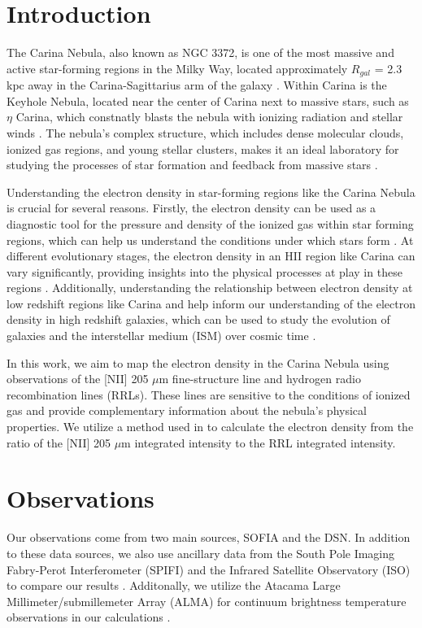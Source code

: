 \section{Introduction}
The Carina Nebula, also known as NGC 3372, is one of the most massive and active star-forming regions in the Milky Way, located approximately $R_{gal}$ = 2.3 kpc away in the Carina-Sagittarius arm of the galaxy \parencite{smith2006census}.
Within Carina is the Keyhole Nebula, located near the center of Carina next to massive stars, such as $\eta$ Carina, which constnatly blasts the nebula with ionizing radiation and stellar winds \parencite{brooks2005simba}.
The nebula's complex structure, which includes dense molecular clouds, ionized gas regions, and young stellar clusters, makes it an ideal laboratory for studying the processes of star formation and feedback from massive stars \parencite{smith2007census}.

Understanding the electron density in star-forming regions like the Carina Nebula is crucial for several reasons. 
Firstly, the electron density can be used as a diagnostic tool for the pressure and density of the ionized gas within star forming regions, which can help us understand the conditions under which stars form \parencite{kaasinen2016cosmos}.
At different evolutionary stages, the electron density in an HII region like Carina can vary significantly, providing insights into the physical processes at play in these regions \parencite{goldsmith2024electron}.
Additionally, understanding the relationship between electron density at low redshift regions like Carina and help inform our understanding of the electron density in high redshift galaxies, which can be used to study the evolution of galaxies and the interstellar medium (ISM) over cosmic time \parencite{shirazi2014stars}.

In this work, we aim to map the electron density in the Carina Nebula using observations of the [NII] 205 $\mu$m fine-structure line and hydrogen radio recombination lines (RRLs). 
These lines are sensitive to the conditions of ionized gas and provide complementary information about the nebula's physical properties. 
We utilize a method used in \cite{pineda2019electron} to calculate the electron density from the ratio of the [NII] 205 $\mu$m integrated intensity to the RRL integrated intensity.
\section{Observations}
Our observations come from two main sources, SOFIA and the DSN.
In addition to these data sources, we also use ancillary data from the South Pole Imaging Fabry-Perot Interferometer (SPIFI) and the Infrared Satellite Observatory (ISO) to compare our results \parencite{oberst2011205}.
Additonally, we utilize the Atacama Large Millimeter/submillemeter Array (ALMA) for continuum brightness temperature observations in our calculations \parencite{Rebolledo_2021}.

